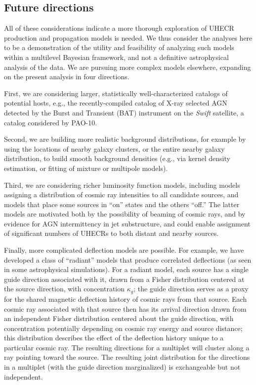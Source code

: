 \subsection{Future directions}

All of these considerations indicate a more thorough exploration of
UHECR production and propagation models is needed.  We thus consider
the analyses here to be a demonstration of the utility and feasibility
of analyzing such models within a multilevel Bayesian framework, and
not a definitive astrophysical analysis of the data.
We are pursuing more complex models elsewhere, expanding on the present
analysis in four directions.

First, we are considering larger, statistically well-characterized catalogs
of potential hosts, e.g., the recently-compiled catalog of X-ray selected
AGN detected by the Burst and Transient (BAT) instrument on the {\em Swift}
satellite, a catalog considered by PAO-10.

Second, we are building more realistic background distributions, for example
by using the locations of nearby galaxy clusters, or the entire nearby
galaxy distribution, to build smooth background densities (e.g., via kernel
density estimation, or fitting of mixture or multipole models).

Third, we are considering richer luminosity function models, including models
assigning a distribution of cosmic ray intensities to all candidate sources,
and models that place some sources in ``on''
states and the others ``off.''  The latter models are motivated both by the
possibility of beaming of cosmic rays, and by evidence for AGN intermittency
in jet substructure, and could enable assignment of significant numbers of
UHECRs to both distant and nearby sources.

Finally, more complicated deflection models are possible.  
For example, we have developed a class of ``radiant'' models that produce
correlated deflections (as seen in some astrophysical simulations).  For a
radiant model, each source has a single guide direction associated with it,
drawn from a Fisher distribution centered at the source direction, with
concentration $\kappa_g$; the guide direction serves as a proxy for the shared
magnetic deflection history of cosmic rays from that source.  Each cosmic ray
associated with that source then has its arrival direction drawn from an
independent Fisher distribution centered about the guide direction, with
concentration potentially depending on cosmic ray energy and source distance;
this distribution describes the effect of the deflection history unique to a
particular cosmic ray.  The resulting directions for a multiplet will cluster
along a ray pointing toward the source.  The resulting joint distribution for
the directions in a multiplet (with the guide direction marginalized) is
exchangeable but not independent.

